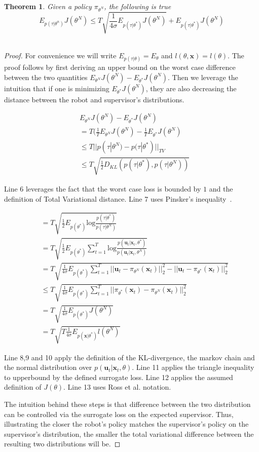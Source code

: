 \documentclass[10pt, conference]{ieeeconf}      %
\newtheorem{theorem}{Theorem}[section]
\newcommand{\bu}{\mathbf{u}}
\newcommand{\bx}{\mathbf{x}}
\begin{document}
\begin{theorem}
Given a policy $\pi_{\theta^N}$, the following is true 
$$E_{p(\tau|\theta^n)} J(\theta^N) \leq T\sqrt{\frac{1}{4\sigma}E_{p(\tau|\theta^*)} J(\theta^N)}+E_{p(\tau|\theta^*)} J(\theta^N)$$\\
\end{theorem}
\begin{proof}
For convenience we will write $E_{p(\tau|\theta)} = E_{\theta}$ and $l(\theta,\bx) = l(\theta)$. The proof follows by first deriving an upper bound on the worst case difference between the two quantities $E_{\theta^N} J(\theta^N) - E_{\theta^*} J(\theta^N) $. Then we leverage the intuition that if one is minimizing $E_{\theta^*} J(\theta^N) $, they are also decreasing the distance between the robot and supervisor's distributions. 



\begin{align}
&E_{\theta^N} J(\theta^N) - E_{\theta^*} J(\theta^N) \\
&= T(\frac{1}{T}E_{\theta^N} J(\theta^N) -\frac{1}{T}E_{\theta^*} J(\theta^N)\\
&\leq  T| | p(\tau|\theta^N) - p(\tau|\theta^*)||_{TV}\\
&\leq T\sqrt{\frac{1}{2} D_{KL}(p(\tau|\theta^*),p(\tau|\theta^N))}
\end{align}

 Line 6 leverages the fact that the worst case loss is bounded by $1$ and the definition of Total Variational distance. Line 7 uses Pinsker's inequality~\cite{verdu2014total}.


\begin{align}
&= T\sqrt{\frac{1}{2} E_{p(\theta^*)} \mbox{log} \frac{p(\tau|\theta^*)}{p(\tau|\theta^N)}}\\
&= T\sqrt{\frac{1}{2} E_{p(\theta^*)} \sum^T_{t=1}\mbox{log} \frac{p(\bu_t|\bx_t,\theta^*)}{p(\bu_t|\bx_t,\theta^N)}}\\
&= T\sqrt{\frac{1}{4\sigma} E_{p(\theta^*)} \sum^T_{t=1} ||\bu_t- \pi_{\theta^N}(\bx_t)||_2^2 - ||\bu_t- \pi_{\theta^*}(\bx_t)||_2^2}\\
&\leq T\sqrt{\frac{1}{4\sigma} E_{p(\theta^*)} \sum^T_{t=1}  ||\pi_{\theta^*}(\bx_t) - \pi_{\theta^N}(\bx_t)||_2^2}\\
&= T\sqrt{\frac{1}{4\sigma} E_{p(\theta^*)} J(\theta^N)}\\
&= T\sqrt{T \frac{1}{4\sigma} E_{p(\bx|\theta^*)} l(\theta^N)}
\end{align}

Line 8,9 and 10 apply the definition of the KL-divergence, the markov chain and the normal distribution over $p(\bu_t|\bx_t,\theta)$. Line 11 applies the triangle inequality to upperbound by the defined surrogate loss. Line 12 applies the assumed definition of $J(\theta)$. Line 13 uses Ross et al. notation. 

The intuition behind these steps is that difference between  the two distribution can be controlled via the surrogate loss on the expected supervisor. Thus, illustrating the closer the robot's policy matches the supervisor's policy on the supervisor's distribution, the smaller the total variational difference between the resulting two distributions will be. 
\end{proof}
\end{document}
